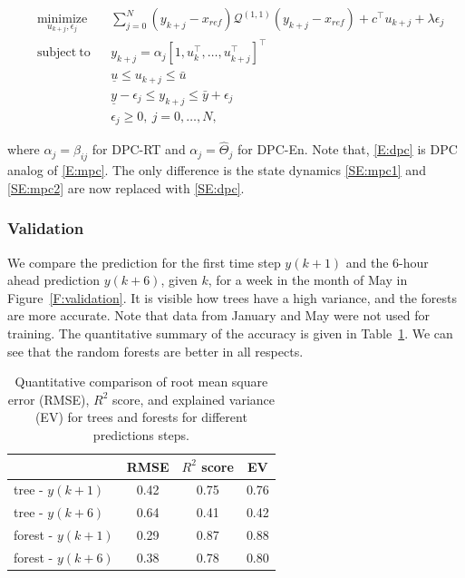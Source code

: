 \begin{subequations}
	\begin{align}
	& \underset{u_{k+j},\epsilon_j}{\mathrm{minimize}} & & \sum_{j=0}^{N} (y_{k+j}-x_{ref})\mathcal{Q}^{(1,1)} (y_{k+j}-x_{ref})+c^\top u_{k+j}+\lambda\epsilon_j \\
	& \mathrm{subject\ to }                              & & y_{k+j} =  \alpha_j \left[1,u^\top_{k},\ldots,u^\top_{k+j} \right]^\top \label{SE:dpc}               \\
	&                                                    & & \underline{u} \leq u_{k+j} \leq \bar{u} 	                                                          \\
	&                                                    & & \underline{y} - \epsilon_j \leq y_{k+j} \leq \bar{y} + \epsilon_j                                    \\
	&                                                    & & \epsilon_j \geq 0, \ j = 0,\dots,N,            									                 
	\end{align}\label{E:dpc}
\end{subequations} 

\noindent where $\alpha_j = \beta_{ij}$ for DPC-RT and $\alpha_j = \hat{\Theta}_{j}$ for DPC-En.
Note that, \eqref{E:dpc} is DPC analog of \eqref{E:mpc}. The only difference is the state dynamics \eqref{SE:mpc1} and \eqref{SE:mpc2} are now replaced with \eqref{SE:dpc}.

\subsubsection{Validation} 
\label{SSS:dpc_val}

We compare the prediction for the first time step $y(k+1)$ and the 6-hour ahead prediction $y(k+6)$, given $k$, for a week in the month of May in Figure~\ref{F:validation}. It is visible how trees have a high variance, and the forests are more accurate. Note that data from January and May were not used for training. The quantitative summary of the accuracy is given in Table~\ref{T:validation}. We can see that the random forests are better in all respects.
\begin{table}[h!]
	\centering
	\begin{tabular}{lccc}
		\toprule
		                 & RMSE & $R^2$ score & EV  \\ 
		\midrule
		tree - $y(k+1)$    & 0.42 & 0.75        & 0.76 \\
		tree - $y(k+6)$    & 0.64 & 0.41        & 0.42 \\
		forest - $y(k+1)$  & 0.29 & 0.87        & 0.88 \\
		forest - $y(k+6)$  & 0.38 & 0.78        & 0.80 \\
		\bottomrule
	\end{tabular}
	\caption{Quantitative comparison of root mean square error (RMSE), $R^2$ score, and explained variance (EV) for trees and forests for different predictions steps.}
	\captionsetup{justification=centering}
	\label{T:validation}
\end{table}

